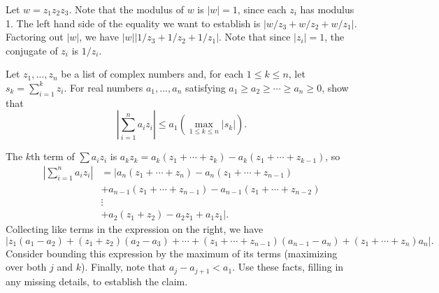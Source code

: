 \smallskip
\begin{hint}
Let $w =  z_1 z_2 z_3$. Note that the modulus of $w$ is $|w| = 1$, since each $z_i$ has modulus 1.
The left hand side of the equality we want to establish is
$| w/z_3 + w/z_2 + w/z_1 |$.
Factoring out $|w|$, we have $|w| |1/z_3 + 1/z_2 + 1/z_1|$.
Note that since $|z_i|=1$, the conjugate of $z_i$ is $1/z_i$.
\end{hint}
\probskip

\begin{prob} 
Let $z_1, \dots, z_n$ be a list of complex
numbers and, for each $1 \leq k \leq n$, 
let $s_k = \sum_{i=1}^k z_i$. For real numbers
$a_1, \dots, a_n$ satisfying 
$a_1 \geq a_2 \geq \cdots \geq a_n \geq 0$, 
show that
\begin{equation}
\label{eq:Abels}  
\left| \sum_{i=1}^n a_i z_i \right| 
\leq a_1 \left( \max_{1 \leq k \leq n} |s_k|\right).
\end{equation}
\end{prob}
\smallskip
\begin{hint}
The $k$th term of $\sum a_i z_i$ is 
$a_k z_k = a_k (z_1+\cdots + z_k) - a_k (z_1+\cdots + z_{k-1})$,
so
\begin{align*}
\left| \sum_{i=1}^n a_i z_i \right|  
&= \left|a_n (z_1+\cdots + z_n) - a_n (z_1+\cdots + z_{n-1}) \right.\\
&+ a_{n-1} (z_1+\cdots + z_{n-1}) - a_{n-1} (z_1+\cdots + z_{n-2}) \\
& \vdots\\
&+ a_2 (z_1+z_2) - a_2 z_1 + \left.a_1 z_1\right|.
\end{align*}
Collecting like terms in the expression on the right, we have
\[
\left| z_1(a_1-a_2)+ (z_1+ z_2)(a_2-a_3) + \cdots + (z_1+\cdots +
  z_{n-1})(a_{n-1}-a_n) + (z_1+\cdots + z_{n})a_n \right|. \]
Consider bounding this expression by the maximum of its terms 
(maximizing over both $j$ and $k$).  Finally, note that $a_j - a_{j+1} < a_1$.
Use these facts, filling in any missing details, to establish the claim.  
\end{hint}
\probskip



